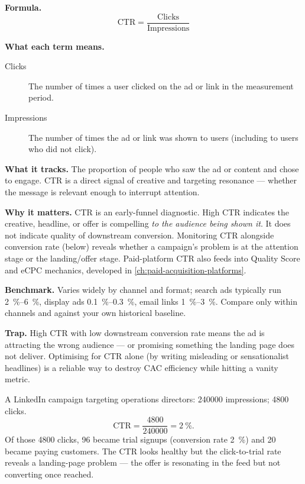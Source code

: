 \textbf{Formula.}
\[
  \mathrm{CTR} = \frac{\text{Clicks}}{\text{Impressions}}
\]

\textbf{What each term means.}
\begin{description}
  \item[Clicks] The number of times a user clicked on the ad or link in the measurement
    period.
  \item[Impressions] The number of times the ad or link was shown to users (including to
    users who did not click).
\end{description}

\textbf{What it tracks.} The proportion of people who saw the ad or content and chose to
engage. CTR is a direct signal of creative and targeting resonance --- whether the message
is relevant enough to interrupt attention.

\textbf{Why it matters.} CTR is an early-funnel diagnostic. High CTR indicates the
creative, headline, or offer is compelling \emph{to the audience being shown it}. It does
not indicate quality of downstream conversion. Monitoring CTR alongside conversion rate
(below) reveals whether a campaign's problem is at the attention stage or the landing/offer
stage. Paid-platform CTR also feeds into Quality Score and eCPC mechanics, developed in
\cref{ch:paid-acquisition-platforms}.

\textbf{Benchmark.} Varies widely by channel and format; search ads typically run
\qty{2}{\percent}--\qty{6}{\percent}, display ads \qty{0.1}{\percent}--\qty{0.3}{\percent},
email links \qty{1}{\percent}--\qty{3}{\percent}. Compare only within channels and against
your own historical baseline.

\textbf{Trap.} High CTR with low downstream conversion rate means the ad is attracting the
wrong audience --- or promising something the landing page does not deliver. Optimising for
CTR alone (by writing misleading or sensationalist headlines) is a reliable way to destroy
CAC efficiency while hitting a vanity metric.

\begin{example}
A LinkedIn campaign targeting operations directors: \num{240000} impressions;
\num{4800} clicks.
\[
  \mathrm{CTR} = \frac{4800}{240000} = \qty{2}{\percent}.
\]
Of those \num{4800} clicks, \num{96} became trial signups (conversion rate \qty{2}{\percent})
and \num{20} became paying customers. The CTR looks healthy but the click-to-trial rate
reveals a landing-page problem --- the offer is resonating in the feed but not converting
once reached.
\end{example}


